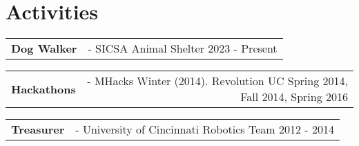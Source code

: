 \documentclass[a4paper,12pt]{article}
\begin{document}
\section{Activities}
\begin{tabularx}{\linewidth}{@{}l r@{}}	
    \textbf{Dog Walker} & \hfill - SICSA Animal Shelter 2023 - Present \\[3.75pt]
\end{tabularx}

\begin{tabularx}{\linewidth}{@{}l r@{}}	
    \textbf{Hackathons} & \hfill - MHacks Winter (2014).  Revolution UC Spring 2014, Fall 2014, Spring 2016 \\[3.75pt]
\end{tabularx}

\begin{tabularx}{\linewidth}{@{}l r@{}}	
    \textbf{Treasurer} & \hfill - University of Cincinnati Robotics Team 2012 - 2014 \\[3.75pt]
\end{tabularx}

\vfill
\end{document}
